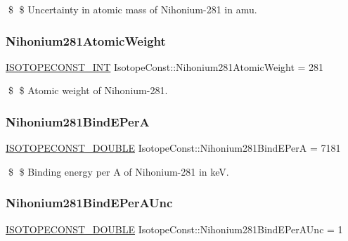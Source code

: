 \$ \$ Uncertainty in atomic mass of Nihonium-\/281 in amu. \mbox{\label{group___isotope_const-_nihonium-_nh281_ga117d2c46d8a65542b3fc3e9ecb68e661}} 
\subsubsection{\texorpdfstring{Nihonium281\+Atomic\+Weight}{Nihonium281AtomicWeight}}
{\footnotesize\ttfamily \mbox{\hyperlink{group___isotope_const-_macros_ga5f18360b3e99483a35c32d789e62621c}{I\+S\+O\+T\+O\+P\+E\+C\+O\+N\+S\+T\+\_\+\+I\+NT}} Isotope\+Const\+::\+Nihonium281\+Atomic\+Weight = 281}

\$ \$ Atomic weight of Nihonium-\/281. \mbox{\label{group___isotope_const-_nihonium-_nh281_ga64eeaefdf8e833c43a18fc20c1173a17}} 
\subsubsection{\texorpdfstring{Nihonium281\+Bind\+E\+PerA}{Nihonium281BindEPerA}}
{\footnotesize\ttfamily \mbox{\hyperlink{group___isotope_const-_macros_ga8f45a7272ce02c0b4c65c44636ed719a}{I\+S\+O\+T\+O\+P\+E\+C\+O\+N\+S\+T\+\_\+\+D\+O\+U\+B\+LE}} Isotope\+Const\+::\+Nihonium281\+Bind\+E\+PerA = 7181}

\$ \$ Binding energy per A of Nihonium-\/281 in keV. \mbox{\label{group___isotope_const-_nihonium-_nh281_gab7c16fd16e924cbf2198b100c067a59e}} 
\subsubsection{\texorpdfstring{Nihonium281\+Bind\+E\+Per\+A\+Unc}{Nihonium281BindEPerAUnc}}
{\footnotesize\ttfamily \mbox{\hyperlink{group___isotope_const-_macros_ga8f45a7272ce02c0b4c65c44636ed719a}{I\+S\+O\+T\+O\+P\+E\+C\+O\+N\+S\+T\+\_\+\+D\+O\+U\+B\+LE}} Isotope\+Const\+::\+Nihonium281\+Bind\+E\+Per\+A\+Unc = 1}

